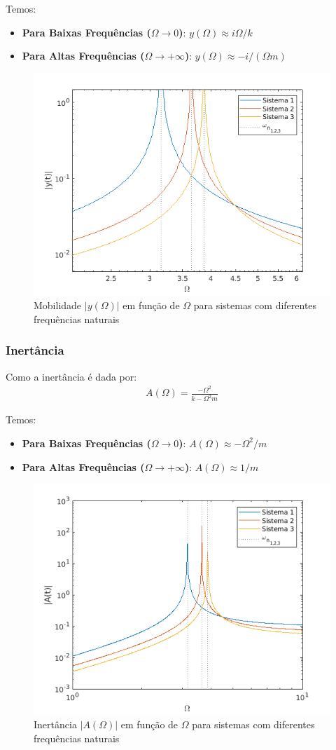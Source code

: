 \documentclass{article}
\begin{document}
Temos:
\begin{itemize}
    \item \textbf{Para Baixas Frequências ($\Omega \rightarrow 0$)}: $y(\Omega) \approx i\Omega/k$
    \item \textbf{Para Altas Frequências ($\Omega \rightarrow +\infty$)}: $y(\Omega) \approx -i/(\Omega m)$
\end{itemize}

\begin{figure}[h]
    \centering
    \includegraphics[width=.4\textwidth]{imgs/mobilidade.png}
    \caption{Mobilidade $|y(\Omega)|$ em função de $\Omega$ para  sistemas com diferentes frequências naturais}
\end{figure}

\subsubsection*{Inertância}
Como a inertância é dada por:
\begin{align*}
    A(\Omega) = \frac{-\Omega^2}{k - \Omega^2m}
\end{align*}

Temos:
\begin{itemize}
    \item \textbf{Para Baixas Frequências ($\Omega \rightarrow 0$)}: $A(\Omega) \approx -\Omega^2 / m$
    \item \textbf{Para Altas Frequências ($\Omega \rightarrow +\infty$)}: $A(\Omega) \approx 1/m$
\end{itemize}

\begin{figure}[h]
    \centering
    \includegraphics[width=.4\textwidth]{imgs/inertancia.png}
    \caption{Inertância $|A(\Omega)|$ em função de $\Omega$ para  sistemas com diferentes frequências naturais}
\end{figure}
\end{document}
